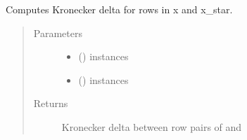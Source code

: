 \documentclass[letterpaper,10pt,english]{sphinxmanual}
\begin{document}
\begin{fulllineitems}
\label{\detokenize{index:bo.covfunc.kronecker_delta}}
Computes Kronecker delta for rows in x and x\_star.
\begin{quote}\begin{description}
\item[{Parameters}] \leavevmode\begin{itemize}
\item {} 
 (\sphinxstyleliteralemphasis{, }\sphinxstyleliteralemphasis{(}\sphinxstyleliteralemphasis{(}\sphinxstyleliteralemphasis{, }\sphinxstyleliteralemphasis{)}\sphinxstyleliteralemphasis{)}) \textendash{} instances

\item {} 
 (\sphinxstyleliteralemphasis{, }\sphinxstyleliteralemphasis{(}\sphinxstyleliteralemphasis{(}\sphinxstyleliteralemphasis{, }\sphinxstyleliteralemphasis{)}\sphinxstyleliteralemphasis{)}) \textendash{} instances

\end{itemize}

\item[{Returns}] \leavevmode
Kronecker delta between row pairs of  and 

\end{description}\end{quote}

\end{fulllineitems}

\end{document}
